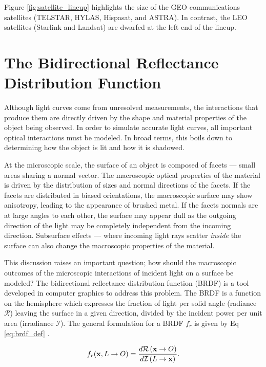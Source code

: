 Figure \ref{fig:satellite_lineup} highlights the size of the GEO communications satellites (TELSTAR, HYLAS, Hispasat, and ASTRA). In contrast, the LEO satellites (Starlink and Landsat) are dwarfed at the left end of the lineup.

\section{The Bidirectional Reflectance Distribution Function}

Although light curves come from unresolved measurements, the interactions that produce them are directly driven by the shape and material properties of the object being observed. In order to simulate accurate light curves, all important optical interactions must be modeled. In broad terms, this boils down to determining how the object is lit and how it is shadowed. 

At the microscopic scale, the surface of an object is composed of facets ---  small areas sharing a normal vector. The macroscopic optical properties of the material is driven by the distribution of sizes and normal directions of the facets. If the facets are distributed in biased orientations, the macroscopic surface may show anisotropy, leading to the appearance of brushed metal. If the facets normals are at large angles to each other, the surface may appear dull as the outgoing direction of the light may be completely independent from the incoming direction. Subsurface effects ---  where incoming light rays scatter \textit{inside} the surface can also change the macroscopic properties of the material. 

This discussion raises an important question; how should the macroscopic outcomes of the microscopic interactions of incident light on a surface be modeled? The bidirectional reflectance distribution function (BRDF) is a tool developed in computer graphics to address this problem. The BRDF is a function on the hemisphere which expresses the fraction of light per solid angle (radiance $\mathcal{R}$) leaving the surface in a given direction, divided by the incident power per unit area (irradiance $\mathcal{I}$). The general formulation for a BRDF $f_r$ is given by Eq \ref{eq:brdf_def} \cite{duvenhage2013}.

\begin{equation}
    f_r(\mathbf{x}, L \rightarrow O) = \frac{d\mathcal{R}\left(\mathbf{x} \rightarrow O\right)}{d\mathcal{I}\left(L \rightarrow \mathbf{x}\right)}.
    \label{eq:brdf_def}
\end{equation}

